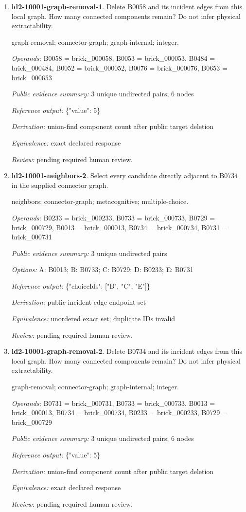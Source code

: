\begin{enumerate}
\item \textbf{ld2-10001-graph-removal-1}. Delete B0058 and its incident edges from this local graph. How many connected components remain? Do not infer physical extractability.
\par{\small graph-removal; connector-graph; graph-internal; integer.\par\textit{Operands:} B0058 = brick\_000058, B0053 = brick\_000053, B0484 = brick\_000484, B0052 = brick\_000052, B0076 = brick\_000076, B0653 = brick\_000653\par\textit{Public evidence summary:} 3 unique undirected pairs; 6 nodes\par\textit{Reference output:} \{"value": 5\}\par\textit{Derivation:} union-find component count after public target deletion\par\textit{Equivalence:} exact declared response\par\textit{Review:} pending required human review.}
\item \textbf{ld2-10001-neighbors-2}. Select every candidate directly adjacent to B0734 in the supplied connector graph.
\par{\small neighbors; connector-graph; metacognitive; multiple-choice.\par\textit{Operands:} B0233 = brick\_000233, B0733 = brick\_000733, B0729 = brick\_000729, B0013 = brick\_000013, B0734 = brick\_000734, B0731 = brick\_000731\par\textit{Public evidence summary:} 3 unique undirected pairs\par\textit{Options:} A: B0013; B: B0733; C: B0729; D: B0233; E: B0731\par\textit{Reference output:} \{"choiceIds": ["B", "C", "E"]\}\par\textit{Derivation:} public incident edge endpoint set\par\textit{Equivalence:} unordered exact set; duplicate IDs invalid\par\textit{Review:} pending required human review.}
\item \textbf{ld2-10001-graph-removal-2}. Delete B0734 and its incident edges from this local graph. How many connected components remain? Do not infer physical extractability.
\par{\small graph-removal; connector-graph; graph-internal; integer.\par\textit{Operands:} B0731 = brick\_000731, B0733 = brick\_000733, B0013 = brick\_000013, B0734 = brick\_000734, B0233 = brick\_000233, B0729 = brick\_000729\par\textit{Public evidence summary:} 3 unique undirected pairs; 6 nodes\par\textit{Reference output:} \{"value": 5\}\par\textit{Derivation:} union-find component count after public target deletion\par\textit{Equivalence:} exact declared response\par\textit{Review:} pending required human review.}

\end{enumerate}
